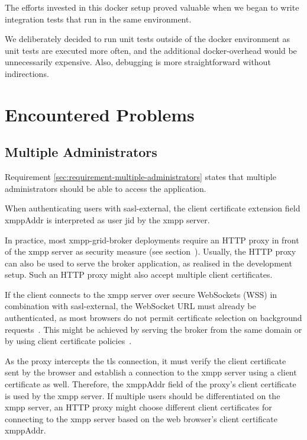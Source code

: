 The efforts invested in this docker setup proved valuable when we began to write integration tests that run in the same environment.

We deliberately decided to run unit tests outside of the docker environment as unit tests are executed more often, and the additional docker-overhead would be unnecessarily expensive.
Also, debugging is more straightforward without indirections.

\section{Encountered Problems}\label{encountered-problems}

\subsection{Multiple Administrators}\label{sec:limitations-of-requirement-multiple-administrators}

Requirement \ref{sec:requirement-multiple-administrators} states that multiple administrators should be able to access the application.

When authenticating users with \gls{sasl-external}, the client certificate extension field xmppAddr is interpreted as user \gls{jid} by the \gls{xmpp} server.

In practice, most \gls{xmpp-grid-broker} deployments require an HTTP proxy in front of the \gls{xmpp} server as security measure (see section~).
Usually, the HTTP proxy can also be used to serve the \gls{broker} application, as realised in the development setup.
Such an HTTP proxy might also accept multiple client certificates.

If the client connects to the \gls{xmpp} server over secure WebSockets (WSS) in combination with \gls{sasl-external}, the WebSocket URL must already be authenticated, as most browsers do not permit certificate selection on background requests~\cite{chromium-issue-background-certs}.
This might be achieved by serving the \gls{broker} from the same domain or by using client certificate policies~\cite{chrome-cert-policies}.

As the proxy intercepts the \gls{tls} connection, it must verify the client certificate sent by the browser and establish a connection to the \gls{xmpp} server using a client certificate as well.
Therefore, the xmppAddr field of the proxy's client certificate is used by the \gls{xmpp} server.
If multiple users should be differentiated on the \gls{xmpp} server, an HTTP proxy might choose different client certificates for connecting to the \gls{xmpp} server based on the web browser's client certificate xmppAddr.


